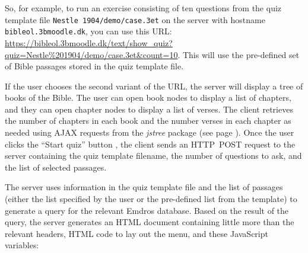 \documentclass[11pt,oneside,a4paper]{memoir}
\begin{document}
So, for example, to run an exercise consisting of ten questions from the quiz template file
\texttt{Nestle~1904/demo/case.3et} on the server with hostname \texttt{bibleol.3bmoodle.dk}, you can
use this URL:
\url{https://bibleol.3bmoodle.dk/text/show_quiz?quiz=Nestle\%201904/demo/case.3et&count=10}. This
will use the pre-defined set of Bible passages stored in the quiz template file.

If the user chooses the second variant of the URL, the server will display a tree of books of the
Bible. The user can open book nodes to display a list of chapters, and they can open chapter nodes
to display a list of verses. The client retrieves the number of chapters in each book and the number
verses in each chapter as needed using AJAX requests from the \emph{jstree} package
(see page \pageref{jstree}). Once the user clicks the ``Start quiz'' button%
,
the client sends an HTTP~POST request to the server containing the
quiz template filename, the number of questions to ask, and the list of selected passages.

The server uses information in the quiz template file and the list of passages (either the list specified
by the user or the pre-defined list from the template) to generate a query for the relevant Emdros
database. Based on the result of the query, the server generates an HTML document containing little
more than the relevant headers, HTML code to lay out the menu, and these JavaScript variables:
\end{document}
